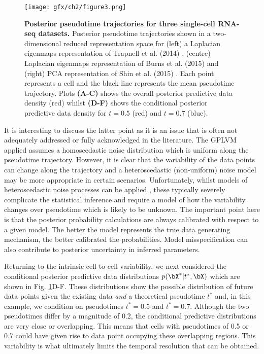 \begin{figure}[h]
\centering
	\texttt{[image: gfx/ch2/figure3.png]}
  	\caption{{\bf Posterior pseudotime trajectories for three single-cell RNA-seq datasets.} Posterior pseudotime trajectories shown in a two-dimensional reduced representation space for (left) a Laplacian eigenmaps representation of Trapnell et al. (2014) \cite{Trapnell2014}, (centre) Laplacian eigenmaps representation of Burns et al. (2015) \cite{Burns2015} and (right) PCA representation of Shin et al. (2015) \cite{Shin2015}. Each point represents a cell and the black line represents the mean pseudotime trajectory. Plots \textbf{(A-C)} shows the overall posterior predictive data density (red) whilst \textbf{(D-F)} shows the conditional posterior predictive data density for $t = 0.5$ (red) and $t = 0.7$ (blue). }
  	\label{fig:posmean}
\end{figure}

It is interesting to discuss the latter point as it is an issue that is often not adequately addressed or fully acknowledged in the literature. The GPLVM applied assumes a homoscedastic noise distribution which is uniform along the pseudotime trajectory. However, it is clear that the variability of the data points can change along the trajectory and a heteroscedastic (non-uniform) noise model may be more appropriate in certain scenarios. Unfortunately, whilst models of heteroscedastic noise processes can be applied \cite{le2005heteroscedastic}, these typically severely complicate the statistical inference and require a model of how the variability changes over pseudotime which is likely to be unknown. The important point here is that the posterior probability calculations are always calibrated with respect to a given model. The better the model represents the true data generating mechanism, the better calibrated the probabilities. Model misspecification can also contribute to posterior uncertainty in inferred parameters.

Returning to the intrinsic cell-to-cell variability, we next considered the conditional posterior predictive data distributions $p(\bX^*|t^*, \bX)$ which are shown in Fig. \ref{fig:posmean}D-F. These distributions show the possible distribution of future data points given the existing data \emph{and} a theoretical pseudotime $t^*$ and, in this example, we condition on pseudotimes $t^* = 0.5$ and $t^* = 0.7$. Although the two pseudotimes differ by a magnitude of 0.2, the conditional predictive distributions are very close or overlapping. This means that cells with pseudotimes of 0.5 or 0.7 could have given rise to data point occupying these overlapping regions. This variability is what ultimately limits the temporal resolution that can be obtained.

